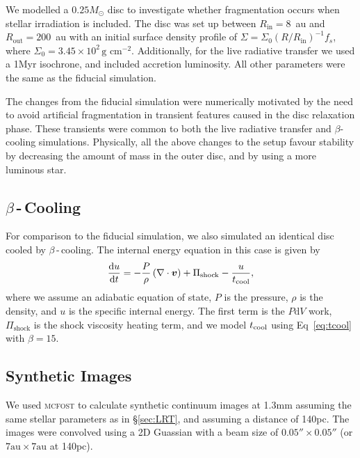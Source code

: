\documentclass[usenatbib]{mnras}
\begin{document}
We modelled a $0.25M_\odot$ disc to investigate whether fragmentation occurs when stellar irradiation is included. The disc was set up between $R_{\mathrm{in}} = 8$~au and $R_\mathrm{out} = 200$~au with an initial surface density profile of $\Sigma = \Sigma_{0}  \left ( {R}/{R_{\mathrm{in}}} \right)^{-1} f_{s}$, where $\Sigma_0 = 3.45 \times 10^2\,\text{g cm}^{-2}$. Additionally, for the live radiative transfer we used a 1Myr isochrone, and included accretion luminosity. All other parameters were the same as the fiducial simulation.

The changes from the fiducial simulation were numerically motivated by the need to avoid artificial fragmentation in transient features caused in the disc relaxation phase. These transients were common to both the live radiative transfer and $\beta$-cooling simulations. Physically, all the above changes to the setup favour stability by decreasing the amount of mass in the outer disc, and by using a more luminous star.


\subsection{$\beta$\,-\,Cooling}

For comparison to the fiducial simulation, we also simulated an identical disc cooled by $\beta$\,-\,cooling. The internal energy equation in this case is
given by
\begin{equation}
    \label{eq:enrg}
	\frac{\mathrm{d}u}{\mathrm{d}t} = -\frac{P}{\rho} \left ( \nabla \cdot \vb*{v} \right) + \Pi_{\mathrm{shock}} - \frac{u}{t_{\mathrm{cool}}},
\end{equation}
where we assume an adiabatic equation of state, $P$ is the pressure, $\rho$ is the density, and $u$ is the specific internal energy. The first term is the $P\mathrm{d}V$ work, $\Pi_{\mathrm{shock}}$ is the shock viscosity heating term, and we model $t_{\rm cool}$ using Eq~\ref{eq:tcool} with $\beta=15$.

\subsection{Synthetic Images}

We used \textsc{mcfost} to calculate synthetic continuum images at 1.3mm assuming the same stellar parameters as in \S\ref{sec:LRT}, and assuming a distance of 140pc.  The images were convolved using a 2D Guassian with a beam size of $0.05'' \times 0.05''$ (or $7\text{au} \times 7\text{au}$ at 140pc).
\end{document}
